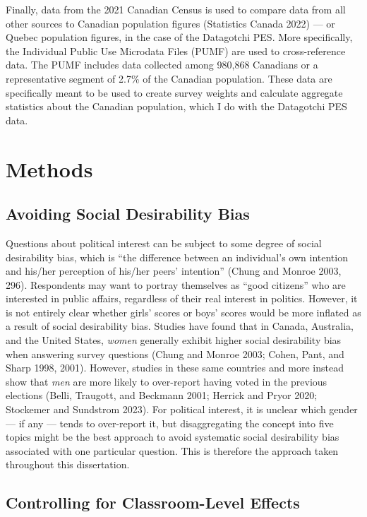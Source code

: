 \documentclass[
  letterpaper,
  DIV=11,
  numbers=noendperiod]{scrreprt}
\begin{document}
Finally, data from the 2021 Canadian Census is used to compare data from
all other sources to Canadian population figures (Statistics Canada
2022) --- or Quebec population figures, in the case of the Datagotchi
PES. More specifically, the Individual Public Use Microdata Files (PUMF)
are used to cross-reference data. The PUMF includes data collected among
980,868 Canadians or a representative segment of 2.7\% of the Canadian
population. These data are specifically meant to be used to create
survey weights and calculate aggregate statistics about the Canadian
population, which I do with the Datagotchi PES data.

\section{Methods}\label{methods}

\subsection{Avoiding Social Desirability
Bias}\label{avoiding-social-desirability-bias}

Questions about political interest can be subject to some degree of
social desirability bias, which is ``the difference between an
individual's own intention and his/her perception of his/her peers'
intention'' (Chung and Monroe 2003, 296). Respondents may want to
portray themselves as ``good citizens'' who are interested in public
affairs, regardless of their real interest in politics. However, it is
not entirely clear whether girls' scores or boys' scores would be more
inflated as a result of social desirability bias. Studies have found
that in Canada, Australia, and the United States, \emph{women} generally
exhibit higher social desirability bias when answering survey questions
(Chung and Monroe 2003; Cohen, Pant, and Sharp 1998, 2001). However,
studies in these same countries and more instead show that \emph{men}
are more likely to over-report having voted in the previous elections
(Belli, Traugott, and Beckmann 2001; Herrick and Pryor 2020; Stockemer
and Sundstrom 2023). For political interest, it is unclear which gender
--- if any --- tends to over-report it, but disaggregating the concept
into five topics might be the best approach to avoid systematic social
desirability bias associated with one particular question. This is
therefore the approach taken throughout this dissertation.

\subsection{Controlling for Classroom-Level
Effects}\label{controlling-for-classroom-level-effects}
\end{document}
